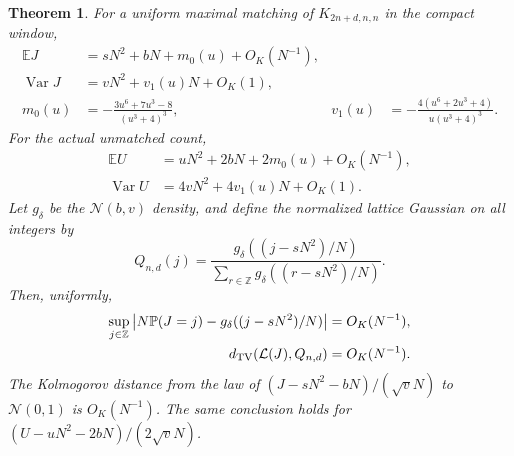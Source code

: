 \documentclass[11pt,letterpaper]{article}
\newtheorem{theorem}{Theorem}[section]
\theoremstyle{remark}\newtheorem{remark}[theorem]{Remark}
\newcommand{\E}{\mathbb E}\newcommand{\Pp}{\mathbb P}
\newcommand{\Var}{\operatorname{Var}}\newcommand{\Poi}{\operatorname{Poisson}}
\newcommand{\Normal}{\mathcal N}
\begin{document}
\begin{theorem}\label{tmm:bd:thm:windowlaw}
For a uniform maximal matching of $K_{2n+d,n,n}$ in the compact window,
\begin{align}
 \E J&=sN^2+bN+m_0(u)+O_K(N^{-1}),\label{tmm:bd:eq:EJwindow}\\
 \Var J&=vN^2+v_1(u)N+O_K(1),\label{tmm:bd:eq:VJwindow}\\
 m_0(u)&=-\frac{3u^6+7u^3-8}{(u^3+4)^3},&
 v_1(u)&=-\frac{4(u^6+2u^3+4)}{u(u^3+4)^3}.\label{tmm:bd:eq:momwindow}
\end{align}
For the actual unmatched count,
\begin{align}
 \E U&=uN^2+2bN+2m_0(u)+O_K(N^{-1}),\label{tmm:bd:eq:EUwindow}\\
 \Var U&=4vN^2+4v_1(u)N+O_K(1).\label{tmm:bd:eq:VUwindow}
\end{align}
Let $g_\delta$ be the $\Normal(b,v)$ density, and define the normalized lattice Gaussian on all integers by
\begin{equation}\label{tmm:bd:eq:Qwindow}
 Q_{n,d}(j)=\frac{g_\delta((j-sN^2)/N)}
 {\sum_{r\in\mathbb Z}g_\delta((r-sN^2)/N)}.
\end{equation}
Then, uniformly,
\begin{align}
 \sup_{j\in\mathbb Z}\left|N\Pp(J=j)-g_\delta((j-sN^2)/N)\right|
       &=O_K(N^{-1}),\label{tmm:bd:eq:localwindow}\\
 \TV(\mathcal L(J),Q_{n,d})&=O_K(N^{-1}).\label{tmm:bd:eq:TVwindow}
\end{align}
The Kolmogorov distance from the law of $(J-sN^2-bN)/(\sqrt vN)$ to $\Normal(0,1)$ is $O_K(N^{-1})$. The same conclusion holds for $(U-uN^2-2bN)/(2\sqrt vN)$.
\end{theorem}
\end{document}
